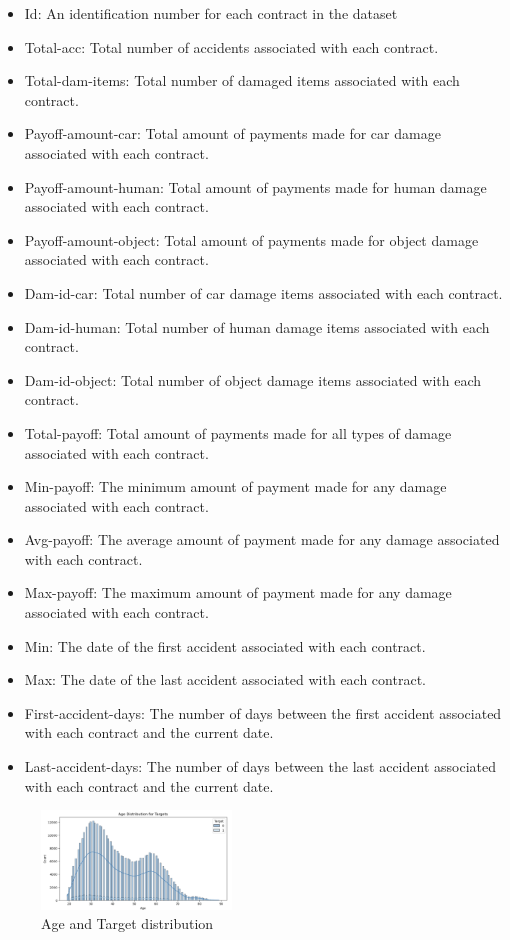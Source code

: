 \documentclass{IEEEtran}
\begin{document}
\begin{itemize}
\item Id: An identification number for each contract in the dataset
\item Total-acc: Total number of accidents associated with each contract.
\item Total-dam-items: Total number of damaged items associated with each contract.
\item Payoff-amount-car: Total amount of payments made for car damage associated with each contract.
\item Payoff-amount-human: Total amount of payments made for human damage associated with each contract.
\item Payoff-amount-object: Total amount of payments made for object damage associated with each contract.
\item Dam-id-car: Total number of car damage items associated with each contract.
\item Dam-id-human: Total number of human damage items associated with each contract.
\item Dam-id-object: Total number of object damage items associated with each contract.
\item Total-payoff: Total amount of payments made for all types of damage associated with each contract.
\item Min-payoff: The minimum amount of payment made for any damage associated with each contract.
\item Avg-payoff: The average amount of payment made for any damage associated with each contract.
\item Max-payoff: The maximum amount of payment made for any damage associated with each contract.
\item Min: The date of the first accident associated with each contract.
\item Max: The date of the last accident associated with each contract.
\item First-accident-days: The number of days between the first accident associated with each contract and the current date.
\item Last-accident-days: The number of days between the last accident associated with each contract and the current date.
\end{itemize}

\begin{figure}[h]
\centering
\includegraphics[width=0.45\textwidth]{age_and_target_distribution.png}
\caption{\label{fig:at}Age and Target distribution  }
\end{figure}
\end{document}

